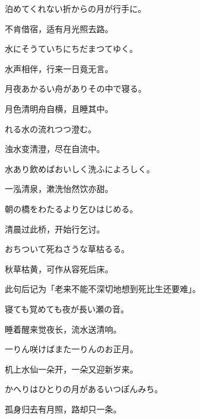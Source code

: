\begin{haiku}
    {\FH 泊めてくれない折からの月が行手に。}

    {\FK 不肯借宿，适有月光照去路。}
\end{haiku}

\begin{haiku}
    {\FH 水にそうていちにちだまつてゆく。}

    {\FK 水声相伴，行来一日竟无言。}
\end{haiku}

\begin{haiku}
    {\FH 月夜あかるい舟がありその中で寝る。}

    {\FK 月色清明舟自横，且睡其中。}
\end{haiku}

\begin{haiku}
    {\FH {}れる水の流れつつ澄む。}

    {\FK 浊水变清澄，尽在自流中。}
\end{haiku}

\begin{haiku}
    {\FH 水あり飲めばおいしく洗ふによろしく。}

    {\FK 一泓清泉，漱洗怡然饮亦甜。}
\end{haiku}

\begin{haiku}
    {\FH 朝の橋をわたるより乞ひはじめる。}

    {\FK 清晨过此桥，开始行乞讨。}
\end{haiku}

\begin{haiku}
    {\FH おちついて死ねさうな草枯るる。}

    {\FK 秋草枯黄，可作从容死后床。}

    {\FS 此句后记为「老来不能不深切地想到死比生还要难」。}
\end{haiku}

\begin{haiku}
    {\FH 寝ても覚めても夜が長い瀬の音。}

    {\FK 睡着醒来觉夜长，流水送清响。}
\end{haiku}

\begin{haiku}
    {\FH 一りん咲けばまた一りんのお正月。}

    {\FK 机上水仙一朵开，一朵又迎新岁来。}
\end{haiku}

\begin{haiku}
    {\FH かへりはひとりの月があるいつぽんみち。}

    {\FK 孤身归去有月照，路却只一条。}
\end{haiku}

